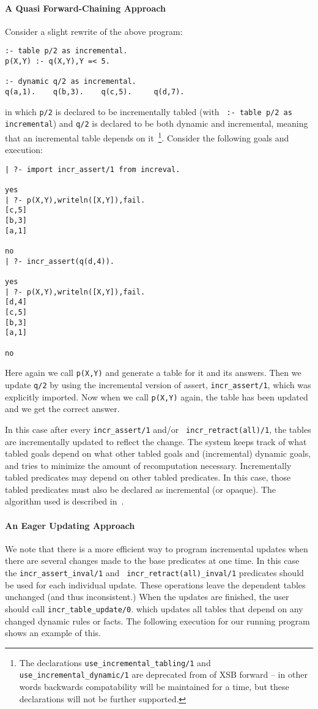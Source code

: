 \paragraph{A Quasi Forward-Chaining Approach}
Consider a slight rewrite of the above program:
\begin{verbatim}
:- table p/2 as incremental.
p(X,Y) :- q(X,Y),Y =< 5.

:- dynamic q/2 as incremental.
q(a,1).    q(b,3).    q(c,5).     q(d,7).
\end{verbatim}
in which {\tt p/2} is declared to be incrementally tabled (with {\tt
  :- table p/2 as incremental}) and {\tt q/2} is declared to be both
dynamic and incremental, meaning that an incremental table depends on
it~\footnote{The declarations {\tt use\_incremental\_tabling/1} and
  {\tt use\_incremental\_dynamic/1} are deprecated from \version{} of
  XSB forward -- in other words backwards compatability will be
  maintained for a time, but these declarations will not be further
  supported.}.  Consider the following goals and execution:
\begin{verbatim}
| ?- import incr_assert/1 from increval.

yes
| ?- p(X,Y),writeln([X,Y]),fail.
[c,5]
[b,3]
[a,1]

no
| ?- incr_assert(q(d,4)).

yes
| ?- p(X,Y),writeln([X,Y]),fail.
[d,4]
[c,5]
[b,3]
[a,1]

no
\end{verbatim}
Here again we call {\tt p(X,Y)} and generate a table for it and its
answers.  Then we update {\tt q/2} by using the incremental version of
assert, {\tt incr\_assert/1}, which was explicitly imported.  Now when
we call {\tt p(X,Y)} again, the table has been updated and we get the
correct answer.

In this case after every {\tt incr\_assert/1} and/or {\tt
  incr\_retract(all)/1}, the tables are incrementally updated to
reflect the change.  The system keeps track of what tabled goals
depend on what other tabled goals and (incremental) dynamic goals, and
tries to minimize the amount of recomputation necessary.
Incrementally tabled predicates may depend on other tabled predicates.
In this case, those tabled predicates must also be declared as
incremental (or opaque).  The algorithm used is described
in~\cite{SaRa05,Saha06}.

\paragraph{An Eager Updating Approach}
%
We note that there is a more efficient way to program incremental
updates when there are several changes made to the base predicates at
one time.  In this case the {\tt incr\_assert\_inval/1} and {\tt
  incr\_retract(all)\_inval/1} predicates should be used for each
individual update.  These operations leave the dependent tables
unchanged (and thus inconsistent.)  When the updates are finished, the
user should call {\tt incr\_table\_update/0}.  which updates all
tables that depend on any changed dynamic rules or facts.  The following execution for our running program shows an example of this.

